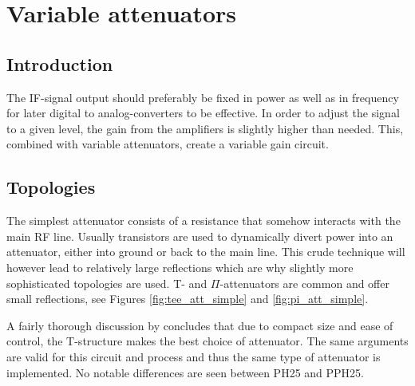 \chapter{Variable attenuators}\label{ch:vargain}
	\section{Introduction}

		The IF-signal output should preferably be fixed in power as well as in frequency for later digital to analog-converters to be effective. In order to adjust the signal to a given level, the gain from the amplifiers is slightly higher than needed. This, combined with variable attenuators, create a variable gain circuit.

	


	\section{Topologies}
		
		The simplest attenuator consists of a resistance that somehow interacts with the main RF line. Usually transistors are used to dynamically divert power into an attenuator, either into ground or back to the main line. This crude technique will however lead to relatively large reflections which are why slightly more sophisticated topologies are used. T- and $\Pi$-attenuators are common and offer small reflections, see Figures \ref{fig:tee_att_simple} and \ref{fig:pi_att_simple}.


		
		A fairly thorough discussion by \citeauthor{gustavsson07} concludes that due to compact size and ease of control, the T-structure makes the best choice of attenuator.\autocite{gustavsson07} The same arguments are valid for this circuit and process and thus the same type of attenuator is implemented. No notable differences are seen between PH25 and PPH25.

